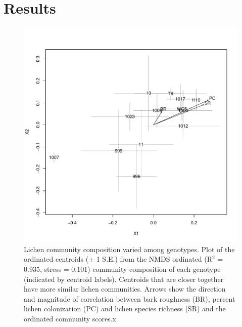 \documentclass[9pt,twocolumn,twoside,lineno]{pnas-new}
\begin{document}
{\section*{Results}


\begin{figure}[ht]
\centering
\includegraphics[width=\linewidth]{com_chplot_onc.pdf}
\caption{Lichen community composition varied among genotypes. Plot of
  the ordinated centroids ($\pm$ 1 S.E.) from the NMDS ordinated
  (R$^2$ = 0.935, stress = 0.101) community composition of each
  genotype (indicated by centroid labels). Centroids that are closer
  together have more similar lichen communities. Arrows show the
  direction and magnitude of correlation between bark roughness (BR),
  percent lichen colonization (PC) and lichen species richness (SR)
  and the ordinated community scores.x}
\label{fig:com_ch_plot}
\end{figure}


}
\end{document}
